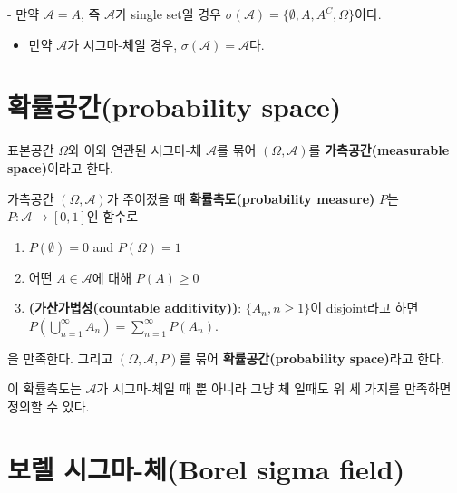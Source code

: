 \documentclass[b5paper,]{scrbook}
\providecommand{\tightlist}{%
  \setlength{\itemsep}{0pt}\setlength{\parskip}{0pt}}
\theoremstyle{plain}
\theoremstyle{definition}
\numberwithin{equation}{section}
\let\BeginKnitrBlock\begin \let\EndKnitrBlock\end
\begin{document}
\BeginKnitrBlock{example}[생성기들]
\protect\hypertarget{exm:unnamed-chunk-75}{}{\label{exm:unnamed-chunk-75} {} }- 만약 \(\mathcal{A}=A\), 즉 \(\mathcal{A}\)가 single set일 경우 \(\sigma(\mathcal{A})=\{ \emptyset, A, A^{C}, \Omega\}\)이다.

\begin{itemize}
\tightlist
\item
  만약 \(\mathcal{A}\)가 시그마-체일 경우, \(\sigma(\mathcal{A})=\mathcal{A}\)다.
\end{itemize}
\EndKnitrBlock{example}

\hypertarget{probability-space}{%
\section{확률공간(probability space)}\label{probability-space}}

\BeginKnitrBlock{definition}[가측공간]
\protect\hypertarget{def:unnamed-chunk-76}{}{\label{def:unnamed-chunk-76} {} }표본공간 \(\Omega\)와 이와 연관된 시그마-체 \(\mathcal{A}\)를 묶어 \((\Omega, \mathcal{A})\)를 \textbf{가측공간(measurable space)}이라고 한다.
\EndKnitrBlock{definition}

\BeginKnitrBlock{definition}[확률측도]
\protect\hypertarget{def:unnamed-chunk-77}{}{\label{def:unnamed-chunk-77} {} }가측공간 \((\Omega, \mathcal{A})\)가 주어졌을 때 \textbf{확률측도(probability measure)} \(P\)는 \(P:\mathcal{A}\rightarrow [0,1]\)인 함수로

\begin{enumerate}
\def\labelenumi{\arabic{enumi}.}
\item
  \(P(\emptyset)=0\) and \(P(\Omega)=1\)
\item
  어떤 \(A\in\mathcal{A}\)에 대해 \(P(A)\geq 0\)
\item
  \textbf{(가산가법성(countable additivity))}: \(\{A_{n}, n\geq 1\}\)이 disjoint라고 하면 \(P(\bigcup_{n=1}^{\infty}A_{n})=\sum_{n=1}^{\infty}P(A_{n}).\)
\end{enumerate}

을 만족한다. 그리고 \((\Omega, \mathcal{A}, P)\)를 묶어 \textbf{확률공간(probability space)}라고 한다.
\EndKnitrBlock{definition}

이 확률측도는 \(\mathcal{A}\)가 시그마-체일 때 뿐 아니라 그냥 체 일때도 위 세 가지를 만족하면 정의할 수 있다.

\hypertarget{--borel-sigma-field}{%
\section{보렐 시그마-체(Borel sigma field)}\label{--borel-sigma-field}}
\end{document}
